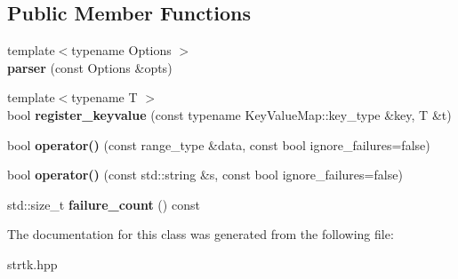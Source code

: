 \subsection*{Public Member Functions}
\begin{DoxyCompactItemize}
\item 
\hypertarget{classstrtk_1_1keyvalue_1_1parser_acea2a28b0fb6ac984d3c3c27a32b3b65}{{\footnotesize template$<$typename Options $>$ }\\{\bfseries parser} (const Options \&opts)}\label{classstrtk_1_1keyvalue_1_1parser_acea2a28b0fb6ac984d3c3c27a32b3b65}

\item 
\hypertarget{classstrtk_1_1keyvalue_1_1parser_a14eb155de12e3fc6cc9980ca8a73740e}{{\footnotesize template$<$typename T $>$ }\\bool {\bfseries register\-\_\-keyvalue} (const typename Key\-Value\-Map\-::key\-\_\-type \&key, T \&t)}\label{classstrtk_1_1keyvalue_1_1parser_a14eb155de12e3fc6cc9980ca8a73740e}

\item 
\hypertarget{classstrtk_1_1keyvalue_1_1parser_a3c200d4cccbb36f2ea0ae470bbb6c618}{bool {\bfseries operator()} (const range\-\_\-type \&data, const bool ignore\-\_\-failures=false)}\label{classstrtk_1_1keyvalue_1_1parser_a3c200d4cccbb36f2ea0ae470bbb6c618}

\item 
\hypertarget{classstrtk_1_1keyvalue_1_1parser_a02698da1a1fa442afbab2b423bdaad57}{bool {\bfseries operator()} (const std\-::string \&s, const bool ignore\-\_\-failures=false)}\label{classstrtk_1_1keyvalue_1_1parser_a02698da1a1fa442afbab2b423bdaad57}

\item 
\hypertarget{classstrtk_1_1keyvalue_1_1parser_a7ab652f64d5adb204083f4b31ec82805}{std\-::size\-\_\-t {\bfseries failure\-\_\-count} () const }\label{classstrtk_1_1keyvalue_1_1parser_a7ab652f64d5adb204083f4b31ec82805}

\end{DoxyCompactItemize}


The documentation for this class was generated from the following file\-:\begin{DoxyCompactItemize}
\item 
strtk.\-hpp\end{DoxyCompactItemize}

